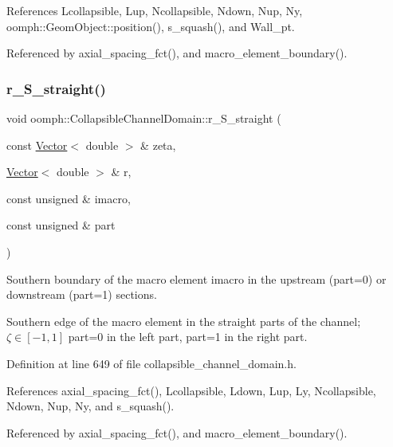 References Lcollapsible, Lup, Ncollapsible, Ndown, Nup, Ny, oomph\+::\+Geom\+Object\+::position(), s\+\_\+squash(), and Wall\+\_\+pt.



Referenced by axial\+\_\+spacing\+\_\+fct(), and macro\+\_\+element\+\_\+boundary().

\mbox{\label{classoomph_1_1CollapsibleChannelDomain_a12b9fbd546a2375fea2461a07b5db089}} 
\subsubsection{\texorpdfstring{r\+\_\+\+S\+\_\+straight()}{r\_S\_straight()}}
{\footnotesize\ttfamily void oomph\+::\+Collapsible\+Channel\+Domain\+::r\+\_\+\+S\+\_\+straight (\begin{DoxyParamCaption}\item[{const \hyperlink{classoomph_1_1Vector}{Vector}$<$ double $>$ \&}]{zeta,  }\item[{\hyperlink{classoomph_1_1Vector}{Vector}$<$ double $>$ \&}]{r,  }\item[{const unsigned \&}]{imacro,  }\item[{const unsigned \&}]{part }\end{DoxyParamCaption})\hspace{0.3cm}{\ttfamily [private]}}



Southern boundary of the macro element imacro in the upstream (part=0) or downstream (part=1) sections. 

Southern edge of the macro element in the straight parts of the channel; $ \zeta \in [-1,1] $ part=0 in the left part, part=1 in the right part. 

Definition at line 649 of file collapsible\+\_\+channel\+\_\+domain.\+h.



References axial\+\_\+spacing\+\_\+fct(), Lcollapsible, Ldown, Lup, Ly, Ncollapsible, Ndown, Nup, Ny, and s\+\_\+squash().



Referenced by axial\+\_\+spacing\+\_\+fct(), and macro\+\_\+element\+\_\+boundary().

